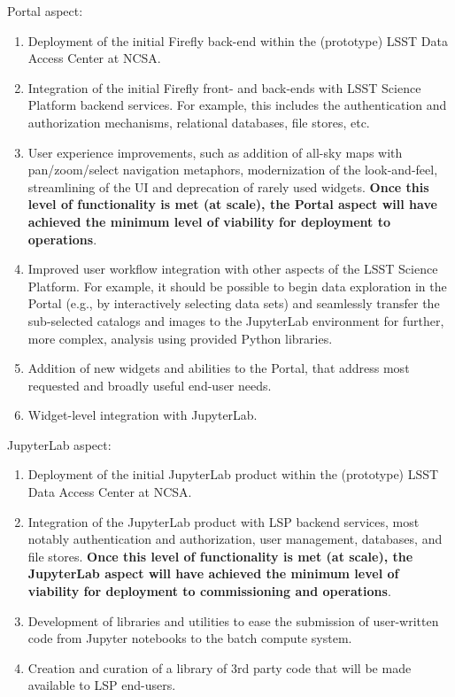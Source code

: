 \documentclass[DM,lsstdraft,toc]{lsstdoc}
\begin{document}
Portal aspect:
\begin{enumerate}
	\item Deployment of the initial Firefly back-end within the (prototype) LSST Data Access Center at NCSA.
	\item Integration of the initial Firefly front- and back-ends with LSST Science Platform backend services. For example, this includes the authentication and authorization mechanisms, relational databases, file stores, etc.
	\item User experience improvements, such as addition of all-sky maps with pan/zoom/select navigation metaphors, modernization of the look-and-feel, streamlining of the UI and deprecation of rarely used widgets. \textbf{Once this level of functionality is met (at scale), the Portal aspect will have achieved the minimum level of viability for deployment to operations}.
	\item Improved user workflow integration with other aspects of the LSST Science Platform. For example, it should be possible to begin data exploration in the Portal (e.g., by interactively selecting data sets) and seamlessly transfer the sub-selected catalogs and images to the JupyterLab environment for further, more complex, analysis using provided Python libraries.
	\item Addition of new widgets and abilities to the Portal, that address most requested and broadly useful end-user needs.
	\item Widget-level integration with JupyterLab.
\end{enumerate}

JupyterLab aspect:
\begin{enumerate}
	\item Deployment of the initial JupyterLab product within the (prototype) LSST Data Access Center at NCSA.
	\item Integration of the JupyterLab product with LSP backend services, most notably authentication and authorization, user management, databases, and file stores. \textbf{Once this level of functionality is met (at scale), the JupyterLab aspect will have achieved the minimum level of viability for deployment to commissioning and operations}.
	\item Development of libraries and utilities to ease the submission of user-written code from Jupyter notebooks to the batch compute system.
	\item Creation and curation of a library of 3rd party code that will be made available to LSP end-users.
\end{enumerate}
\end{document}
